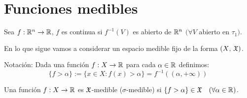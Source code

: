 \section{Funciones medibles}

\begin{prop}
    Sea \(f: \mathbb{R}^n \to \mathbb{R}\), \(f\) es continua si \(f^{-1}(V)\) es abierto de \( \mathbb{R}^n\) \((\forall V\) abierto en \(\tau_1)\).
\end{prop}
En lo que sigue vamos a considerar un espacio medible fijo de la forma \((X \text{, } \mathfrak{X})\).

Notación: Dada una función \(f: X \to \mathbb{R}\) para cada \(\alpha \in \mathbb{R}\) definimos: \begin{equation*}
    \{ f > \alpha \} := \{ x \in X : f(x) > \alpha \} = f^{-1}((\alpha, +\infty))
\end{equation*}

\begin{definition}
    Una función \(f: X \to \mathbb{R}\) es \(\mathfrak{X}\)-medible (\( \sigma \)-medible) si \(\{ f > \alpha \} \in \mathfrak{X} \quad (\forall \alpha \in \mathbb{R})\).
\end{definition}

